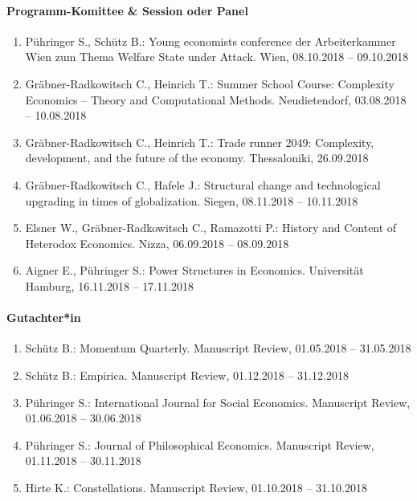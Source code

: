 \paragraph{Programm-Komittee \& Session oder Panel}
\begin{enumerate}[leftmargin=*, labelsep=0.5cm]
\item Pühringer S., Schütz B.: Young economists conference der Arbeiterkammer Wien zum Thema \glqq Welfare State under Attack\grqq{}. Wien, 08.10.2018 -- 09.10.2018
\item Gräbner-Radkowitsch C., Heinrich T.: Summer School Course: Complexity Economics -- Theory and Computational Methods. Neudietendorf, 03.08.2018 -- 10.08.2018
\item Gräbner-Radkowitsch C., Heinrich T.: Trade runner 2049: Complexity, development, and the future of the economy. Thessaloniki, 26.09.2018
\item Gräbner-Radkowitsch C., Hafele J.: Structural change and technological upgrading in times of globalization. Siegen, 08.11.2018 -- 10.11.2018
\item Elsner W., Gräbner-Radkowitsch C., Ramazotti P.: History and Content of Heterodox Economics. Nizza, 06.09.2018 -- 08.09.2018
\item Aigner E., Pühringer S.: Power Structures in Economics. Universität Hamburg, 16.11.2018 -- 17.11.2018
\end{enumerate}

\paragraph{Gutachter*in}
\begin{enumerate}[leftmargin=*, labelsep=0.5cm]
\item Schütz B.: Momentum Quarterly. Manuscript Review, 01.05.2018 -- 31.05.2018
\item Schütz B.: Empirica. Manuscript Review, 01.12.2018 -- 31.12.2018
\item Pühringer S.: International Journal for Social Economics. Manuscript Review, 01.06.2018 -- 30.06.2018
\item Pühringer S.: Journal of Philosophical Economics. Manuscript Review, 01.11.2018 -- 30.11.2018
\item Hirte K.: Constellations. Manuscript Review, 01.10.2018 -- 31.10.2018
\end{enumerate}

